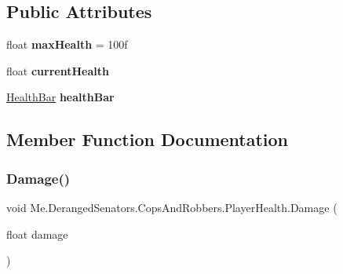 \subsection*{Public Attributes}
\begin{DoxyCompactItemize}
\item 
\mbox{\label{classMe_1_1DerangedSenators_1_1CopsAndRobbers_1_1PlayerHealth_aac39db7253ce39a27b677d61e77061a3}} 
float {\bfseries max\+Health} = 100f
\item 
\mbox{\label{classMe_1_1DerangedSenators_1_1CopsAndRobbers_1_1PlayerHealth_a1e32f931882005334e8662a6cb3116b2}} 
float {\bfseries current\+Health}
\item 
\mbox{\label{classMe_1_1DerangedSenators_1_1CopsAndRobbers_1_1PlayerHealth_aa3373c5f0f140b866fe39274a35e07ec}} 
\hyperlink{classMe_1_1DerangedSenators_1_1CopsAndRobbers_1_1HealthBar}{Health\+Bar} {\bfseries health\+Bar}
\end{DoxyCompactItemize}


\subsection{Member Function Documentation}
\mbox{\label{classMe_1_1DerangedSenators_1_1CopsAndRobbers_1_1PlayerHealth_ae6f3fca7021e61a5e901d1aaff404e26}} 
\subsubsection{\texorpdfstring{Damage()}{Damage()}}
{\footnotesize\ttfamily void Me.\+Deranged\+Senators.\+Cops\+And\+Robbers.\+Player\+Health.\+Damage (\begin{DoxyParamCaption}\item[{float}]{damage }\end{DoxyParamCaption})\hspace{0.3cm}{\ttfamily [inline]}}



